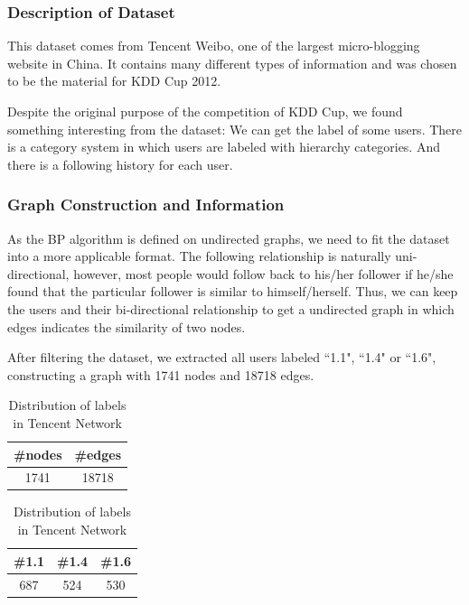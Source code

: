 \subsubsection*{Description of Dataset}
This dataset comes from Tencent Weibo, one of the largest micro-blogging website in China.
It contains many different types of information and was chosen to be the material for KDD Cup 2012.

Despite the original purpose of the competition of KDD Cup, we found something interesting from the dataset:
We can get the label of some users. There is a category system in which users are labeled with hierarchy categories. And there is a following history for each user.

\subsubsection*{Graph Construction and Information}
As the BP algorithm is defined on undirected graphs, we need to fit the dataset into a more applicable format.
The following relationship is naturally uni-directional, however, most people would follow back to his/her follower if he/she found that the particular follower is similar to himself/herself.
Thus, we can keep the users and their bi-directional relationship to get a undirected graph in which edges indicates the similarity of two nodes.

After filtering the dataset, we extracted all users labeled ``1.1", ``1.4" or ``1.6", constructing a graph with 1741 nodes and 18718 edges.

\begin{table}[!ht]
\centering
\begin{tabular}{cc}
\toprule
\textbf{\#nodes} & \textbf{\#edges}\\
\midrule
1741 & 18718\\
\bottomrule
\end{tabular}
\caption{Tencent Network}

\begin{tabular}{ccc}
\toprule
\textbf{\#1.1} & \textbf{\#1.4} & \textbf{\#1.6}\\
\midrule
687 & 524 & 530\\
\bottomrule
\end{tabular}
\caption{Distribution of labels in Tencent Network}
\end{table}

